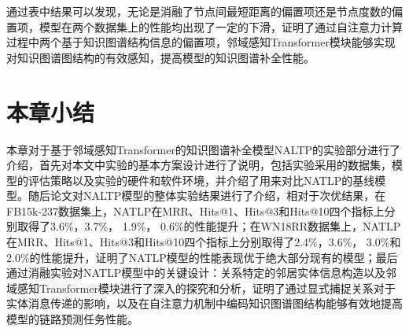 通过表中结果可以发现，无论是消融了节点间最短距离的偏置项还是节点度数的偏置项，模型在两个数据集上的性能均出现了一定的下滑，证明了通过自注意力计算过程中两个基于知识图谱结构信息的偏置项，邻域感知Transformer模块能够实现对知识图谱图结构的有效感知，提高模型的知识图谱补全性能。


\section{本章小结}

本章对于基于邻域感知Transformer的知识图谱补全模型NALTP的实验部分进行了介绍，首先对本文中实验的基本方案设计进行了说明，包括实验采用的数据集，模型的评估策略以及实验的硬件和软件环境，并介绍了用来对比NATLP的基线模型。随后论文对NALTP模型的整体实验结果进行了介绍，相对于次优结果，在FB15k-237数据集上，NATLP在MRR、Hits@1、Hits@3和Hits@10四个指标上分别取得了3.6\%，3.7\%， 1.9\%， 0.6\%的性能提升；在WN18RR数据集上，NATLP在MRR、Hits@1、Hits@3和Hits@10四个指标上分别取得了2.4\%，3.6\%， 3.0\%和2.0\%的性能提升，证明了NATLP模型的性能表现优于绝大部分现有的模型；最后通过消融实验对NATLP模型中的关键设计：关系特定的邻居实体信息构造以及邻域感知Transformer模块进行了深入的探究和分析，证明了通过显式捕捉关系对于实体消息传递的影响，以及在自注意力机制中编码知识图谱图结构能够有效地提高模型的链路预测任务性能。
